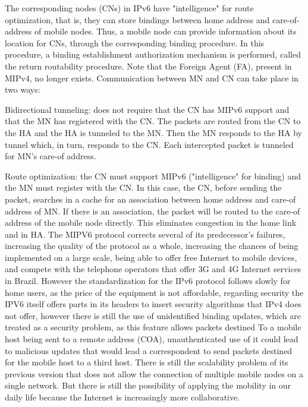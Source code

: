 \documentclass[12pt]{article}
\begin{document}
The corresponding nodes (CNs) in IPv6 have "intelligence" for route optimization, that is, they can store bindings between home address and care-of-address of mobile nodes. Thus, a mobile node can provide information about its location for CNs, through the corresponding binding procedure. In this procedure, a binding establishment authorization mechanism is performed, called the return routability procedure. Note that the Foreign Agent (FA), present in MIPv4, no longer exists. Communication between MN and CN can take place in two ways:

  Bidirectional tunneling: does not require that the CN has MIPv6 support and that the MN has registered with the CN. The packets are routed from the CN to the HA and the HA is tunneled to the MN. Then the MN responds to the HA by tunnel which, in turn, responds to the CN. Each intercepted packet is tunneled for MN's care-of address.

Route optimization: the CN must support MIPv6 ("intelligence" for binding) and the MN must register with the CN. In this case, the CN, before sending the packet, searches in a cache for an association between home address and care-of address of MN. If there is an association, the packet will be routed to the care-of address of the mobile node directly. This eliminates congestion in the home link and in HA. The MIPV6 protocol corrects several of its predecessor's failures, increasing the quality of the protocol as a whole, increasing the chances of being implemented on a large scale, being able to offer free Internet to mobile devices, and compete with the telephone operators that offer 3G and 4G Internet services in Brazil. However the standardization for the IPv6 protocol follows slowly for home users, as the price of the equipment is not affordable, regarding security the IPV6 itself offers parts in its headers to insert security algorithms that IPv4 does not offer, however there is still the use of unidentified binding updates, which are treated as a security problem, as this feature allows packets destined To a mobile host being sent to a remote address (COA), unauthenticated use of it could lead to malicious updates that would lead a correspondent to send packets destined for the mobile host to a third host. There is still the scalability problem of its previous version that does not allow the connection of multiple mobile nodes on a single network. But there is still the possibility of applying the mobility in our daily life because the Internet is 
increasingly more collaborative.
\end{document}
